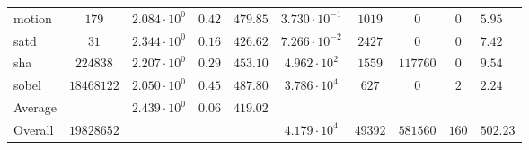 \begin{tabular}{|l|c|HHc|c|c|c|cH|}
motion        & $ 179      $ & $ 2.084 \cdot 10^{0} $ & $ 0.42  $ & $ 479.85 $ & $ 3.730 \cdot 10^{-1} $ & $ 1019  $ & $ 0      $ & $ 0   $ & $ 5.95    $ \\
satd          & $ 31       $ & $ 2.344 \cdot 10^{0} $ & $ 0.16  $ & $ 426.62 $ & $ 7.266 \cdot 10^{-2} $ & $ 2427  $ & $ 0      $ & $ 0   $ & $ 7.42    $ \\
sha           & $ 224838   $ & $ 2.207 \cdot 10^{0} $ & $ 0.29  $ & $ 453.10 $ & $ 4.962 \cdot 10^{2}  $ & $ 1559  $ & $ 117760 $ & $ 0   $ & $ 9.54    $ \\
sobel         & $ 18468122 $ & $ 2.050 \cdot 10^{0} $ & $ 0.45  $ & $ 487.80 $ & $ 3.786 \cdot 10^{4}  $ & $ 627   $ & $ 0      $ & $ 2   $ & $ 2.24    $ \\
\hline
Average       & $          $ & $ 2.439 \cdot 10^{0} $ & $ 0.06  $ & $ 419.02 $ & $                     $ & $       $ & $        $ & $     $ & $         $ \\
\hline
Overall       & $ 19828652 $ & $                    $ & $       $ & $        $ & $ 4.179 \cdot 10^{4}  $ & $ 49392 $ & $ 581560 $ & $ 160 $ & $ 502.23  $ \\
\hline
\end{tabular}
